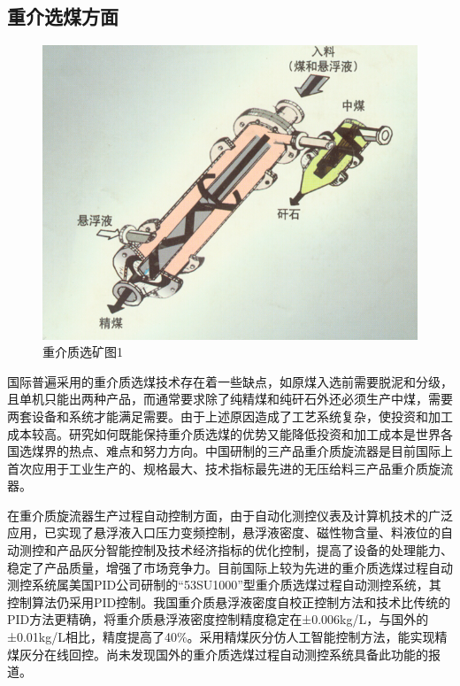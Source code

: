 \documentclass[10pt,openany]{ctexbook}
\begin{document}
\subsection{重介选煤方面}
\begin{center}

   \begin{figure}[!ht]
\includegraphics[scale=0.6]{21}
\caption{重介质选矿图1}
\end{figure}

\end{center}
国际普遍采用的重介质选煤技术存在着一些缺点，如原煤入选前需要脱泥和分级，且单机只能出两种产品，而通常要求除了纯精煤和纯矸石外还必须生产中煤，需要两套设备和系统才能满足需要。由于上述原因造成了工艺系统复杂，使投资和加工成本较高。研究如何既能保持重介质选煤的优势又能降低投资和加工成本是世界各国选煤界的热点、难点和努力方向。中国研制的三产品重介质旋流器是目前国际上首次应用于工业生产的、规格最大、技术指标最先进的无压给料三产品重介质旋流器。\par
在重介质旋流器生产过程自动控制方面，由于自动化测控仪表及计算机技术的广泛应用，已实现了悬浮液入口压力变频控制，悬浮液密度、磁性物含量、料液位的自动测控和产品灰分智能控制及技术经济指标的优化控制，提高了设备的处理能力、稳定了产品质量，增强了市场竞争力。目前国际上较为先进的重介质选煤过程自动测控系统属美国PID公司研制的“53SU1000”型重介质选煤过程自动测控系统，其控制算法仍采用PID控制。我国重介质悬浮液密度自校正控制方法和技术比传统的PID方法更精确，将重介质悬浮液密度控制精度稳定在±0.006kg/L，与国外的±0.01kg/L相比，精度提高了40\%。采用精煤灰分仿人工智能控制方法，能实现精煤灰分在线回控。尚未发现国外的重介质选煤过程自动测控系统具备此功能的报道。\par
\end{document}

